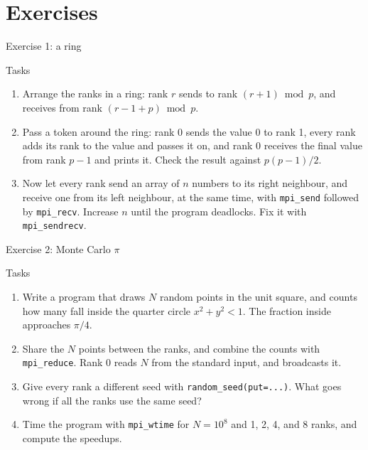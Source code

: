 \section{Exercises}

\begin{frame}{Exercise 1: a ring}
  \begin{block}{Tasks}
    \begin{enumerate}
      \item Arrange the ranks in a ring: rank $r$ sends to rank $(r + 1) \bmod p$, and receives from rank $(r - 1 + p) \bmod p$.
      \item Pass a token around the ring: rank 0 sends the value 0 to rank 1, every rank adds its rank to the value and passes it on, and rank 0 receives the final value from rank $p - 1$ and prints it. Check the result against $p(p - 1)/2$.
      \item Now let every rank send an array of $n$ numbers to its right neighbour, and receive one from its left neighbour, at the same time, with \texttt{mpi\_send} followed by \texttt{mpi\_recv}. Increase $n$ until the program deadlocks. Fix it with \texttt{mpi\_sendrecv}.
    \end{enumerate}
  \end{block}
\end{frame}


\begin{frame}{Exercise 2: Monte Carlo $\pi$}
  \begin{block}{Tasks}
    \begin{enumerate}
      \item Write a program that draws $N$ random points in the unit square, and counts how many fall inside the quarter circle $x^2 + y^2 < 1$. The fraction inside approaches $\pi / 4$.
      \item Share the $N$ points between the ranks, and combine the counts with \texttt{mpi\_reduce}. Rank 0 reads $N$ from the standard input, and broadcasts it.
      \item Give every rank a different seed with \texttt{random\_seed(put=...)}. What goes wrong if all the ranks use the same seed?
      \item Time the program with \texttt{mpi\_wtime} for $N = 10^8$ and 1, 2, 4, and 8 ranks, and compute the speedups.
    \end{enumerate}
  \end{block}
\end{frame}


